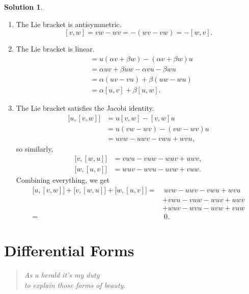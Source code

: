 \documentclass[11pt, a4paper]{report}
\theoremstyle{definition}
\newtheorem{sol}{Solution}[part]
\newenvironment{epigraph}
    {\begin{quote}\small\itshape} %
    {\end{quote}\ignorespacesafterend\vspace{\parskip}}
\begin{document}
\begin{sol}
\mbox{}

\begin{enumerate}

\item The Lie bracket is antisymmetric.
    \[
        [v, w] = vw - wv = -(wv - vw) = -[w, v].
    \]

\item The Lie bracket is linear.
    \begin{align*}
        [u, \alpha v + \beta w] &= u (\alpha v + \beta w) - (\alpha v + \beta w) u \\
            &= \alpha uv + \beta uw - \alpha vu - \beta wu \\
            &= \alpha(uv - vu) + \beta(uw - wu) \\
            &= \alpha [u, v] + \beta [u, w].
    \end{align*}

\item The Lie bracket satisfies the Jacobi identity.
    \begin{align*}
        \big[u, [v, w]\big] &= u[v, w] - [v, w]u \\
            &= u(vw - wv) - (vw - wv)u \\
            &= uvw - uwv - vwu + wvu,
    \end{align*}
    so similarly,
    \begin{align*}
        \big[v, [w, u]\big] &= vwu - vuw - wuv + uwv, \\
        \big[w, [u, v]\big] &= wuv - wvu - uvw + vuw.
    \end{align*}
    Combining everything, we get
    \begin{align*}
        \big[u, [v, w]\big] + \big[v, [w, u]\big] + \big[w, [u, v]\big] =&\ uvw - uwv - vwu + wvu \\
            &+ vwu - vuw - wuv + uwv \\
            &+ wuv - wvu - uvw + vuw \\
            =&\ 0.
    \end{align*}
\end{enumerate}

\end{sol}

\chapter{Differential Forms}

\begin{epigraph}
    As a herald it's my duty \\
    \mbox{}\hspace{1em} to explain those forms of beauty.
\end{epigraph}
\end{document}
